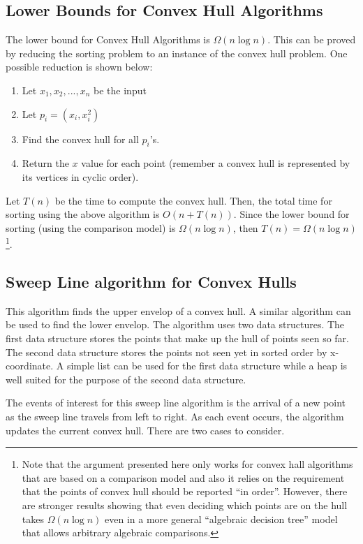 \documentclass{article}
\begin{document}
\subsection{Lower Bounds for Convex Hull Algorithms}

The lower bound for Convex Hull Algorithms is $\Omega (n \log n)$. This can be proved by reducing the sorting problem to an instance of the convex hull problem. One possible reduction is shown below:

\begin{enumerate}
\item Let $x_1, x_2, ..., x_n$ be the input
\item Let $p_i = (x_i, x_i^2)$
\item Find the convex hull for all $p_i$'s. 
\item Return the $x$ value for each point (remember a convex hull is represented by its vertices in cyclic order).
\end{enumerate}

Let $T(n)$ be the time to compute the convex hull. Then, the total time for sorting using the above algorithm is $O(n + T(n))$. Since the lower bound for sorting (using the comparison model) is $\Omega (n \log n)$, then $T(n) = \Omega (n \log n)$ \footnote{Note that the argument presented here only works for convex hall algorithms that are based on a comparison model and also it relies on the requirement that the points of convex hull should be reported ``in order''.  However, there are stronger results showing that even deciding which points are on the hull takes $\Omega(n \log n)$ even in a more general ``algebraic decision tree'' model that allows arbitrary algebraic comparisons.}.


\subsection{Sweep Line algorithm for Convex Hulls}

This algorithm finds the upper envelop of a convex hull.  A similar algorithm can be used to find the lower envelop. The algorithm uses two data structures. The first data structure stores the points that make up the hull of points seen so far. The second data structure stores the points not seen yet in sorted order by x-coordinate. A simple list can be used for the first data structure while a heap is well suited for the purpose of the second data structure. 

The events of interest for this sweep line algorithm is the arrival of a new point as the sweep line travels from left to right. As each event occurs, the algorithm updates the current convex hull. There are two cases to consider.
\end{document}
